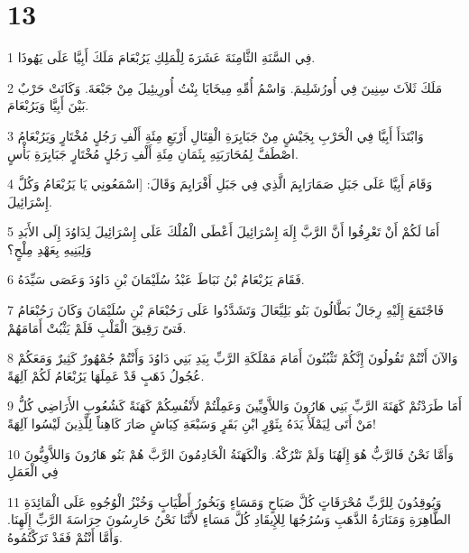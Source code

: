 \chapter{13}

\par 1 فِي السَّنَةِ الثَّامِنَةَ عَشَرَةَ لِلْمَلِكِ يَرُبْعَامَ مَلَكَ أَبِيَّا عَلَى يَهُوذَا.
\par 2 مَلَكَ ثَلاَثَ سِنِينَ فِي أُورُشَلِيمَ. وَاسْمُ أُمِّهِ مِيخَايَا بِنْتُ أُورِيئِيلَ مِنْ جَبْعَةَ. وَكَانَتْ حَرْبٌ بَيْنَ أَبِيَّا وَيَرُبْعَامَ.
\par 3 وَابْتَدَأَ أَبِيَّا فِي الْحَرْبِ بِجَيْشٍ مِنْ جَبَابِرَةِ الْقِتَالِ أَرْبَعِ مِئَةِ أَلْفِ رَجُلٍ مُخْتَارٍ وَيَرُبْعَامُ اصْطَفَّ لِمُحَارَبَتِهِ بِثَمَانِ مِئَةِ أَلْفِ رَجُلٍ مُخْتَارٍ جَبَابِرَةِ بَأْسٍ.
\par 4 وَقَامَ أَبِيَّا عَلَى جَبَلِ صَمَارَايِمَ الَّذِي فِي جَبَلِ أَفْرَايِمَ وَقَالَ: [اسْمَعُونِي يَا يَرُبْعَامُ وَكُلَّ إِسْرَائِيلَ.
\par 5 أَمَا لَكُمْ أَنْ تَعْرِفُوا أَنَّ الرَّبَّ إِلَهَ إِسْرَائِيلَ أَعْطَى الْمُلْكَ عَلَى إِسْرَائِيلَ لِدَاوُدَ إِلَى الأَبَدِ وَلِبَنِيهِ بِعَهْدِ مِلْحٍ؟
\par 6 فَقَامَ يَرُبْعَامُ بْنُ نَبَاطَ عَبْدُ سُلَيْمَانَ بْنِ دَاوُدَ وَعَصَى سَيِّدَهُ.
\par 7 فَاجْتَمَعَ إِلَيْهِ رِجَالٌ بَطَّالُونَ بَنُو بَلِيَّعَالَ وَتَشَدَّدُوا عَلَى رَحُبْعَامَ بْنِ سُلَيْمَانَ وَكَانَ رَحُبْعَامُ فَتىً رَقِيقَ الْقَلْبِ فَلَمْ يَثْبُتْ أَمَامَهُمْ.
\par 8 وَالآنَ أَنْتُمْ تَقُولُونَ إِنَّكُمْ تَثْبُتُونَ أَمَامَ مَمْلَكَةِ الرَّبِّ بِيَدِ بَنِي دَاوُدَ وَأَنْتُمْ جُمْهُورٌ كَثِيرٌ وَمَعَكُمْ عُجُولُ ذَهَبٍ قَدْ عَمِلَهَا يَرُبْعَامُ لَكُمْ آلِهَةً.
\par 9 أَمَا طَرَدْتُمْ كَهَنَةَ الرَّبِّ بَنِي هَارُونَ وَاللاَّوِيِّينَ وَعَمِلْتُمْ لأَنْفُسِكُمْ كَهَنَةً كَشُعُوبِ الأَرَاضِي كُلُّ مَنْ أَتَى لِيَمْلَأَ يَدَهُ بِثَوْرٍ ابْنِ بَقَرٍ وَسَبْعَةِ كِبَاشٍ صَارَ كَاهِناً لِلَّذِينَ لَيْسُوا آلِهَةً!
\par 10 وَأَمَّا نَحْنُ فَالرَّبُّ هُوَ إِلَهُنَا وَلَمْ نَتْرُكْهُ. وَالْكَهَنَةُ الْخَادِمُونَ الرَّبَّ هُمْ بَنُو هَارُونَ وَاللاَّوِيُّونَ فِي الْعَمَلِ
\par 11 وَيُوقِدُونَ لِلرَّبِّ مُحْرَقَاتٍ كُلَّ صَبَاحٍ وَمَسَاءٍ وَبَخُورُ أَطْيَابٍ وَخُبْزُ الْوُجُوهِ عَلَى الْمَائِدَةِ الطَّاهِرَةِ وَمَنَارَةُ الذَّهَبِ وَسُرُجُهَا لِلإِيقَادِ كُلَّ مَسَاءٍ لأَنَّنَا نَحْنُ حَارِسُونَ حِرَاسَةَ الرَّبِّ إِلَهِنَا. وَأَمَّا أَنْتُمْ فَقَدْ تَرَكْتُمُوهُ.
